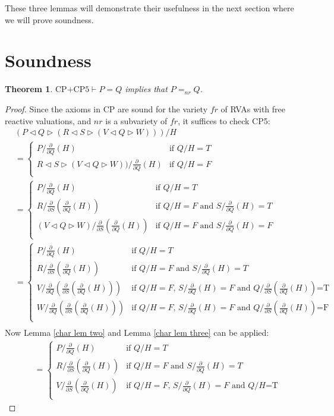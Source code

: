 \documentclass[a4paper,twoside,openright]{report}
\newcommand{\dd}[1]{\frac{\partial}{\partial #1}}
\newcommand{\lef}{\ensuremath{\triangleleft}}
\newcommand{\rig}{\ensuremath{\triangleright}}
\newtheorem{thm}[theorem]{Theorem}
\begin{document}
These three lemmas will demonstrate their usefulness in the next section where we will prove soundness.

\section{Soundness}
\begin{thm}
$\text{CP+CP5}\vdash P=Q$ implies that $P=_{nr}Q$.
\end{thm}
\begin{proof}
Since the axioms in CP are sound for the variety $fr$ of RVAs with free reactive valuations, and $nr$ is a subvariety of $fr$, it suffices to check CP5:
\begin{align*}
&(P\lef Q\rig(R\lef S\rig(V\lef Q\rig W)))/H\\
&=\begin{cases}
P/\dd Q(H) & \text{if $Q/H=T$}\\
R\lef S\rig(V\lef Q\rig W))/\dd Q(H) & \text{if $Q/H=F$}\\
\end{cases}\\
&=\begin{cases}
P/\dd Q(H) & \text{if $Q/H=T$}\\
R/\dd S(\dd Q(H)) & \text{if $Q/H=F$ and $S/\dd Q(H)=T$}\\
(V\lef Q\rig W)/\dd S(\dd Q(H)) & \text{if $Q/H=F$ and $S/\dd Q(H)=F$}\\
\end{cases}\\
&=\begin{cases}
P/\dd Q(H) & \text{if $Q/H=T$}\\
R/\dd S(\dd Q(H)) & \text{if $Q/H=F$ and $S/\dd Q(H)=T$}\\
V/\dd Q(\dd S(\dd Q(H))) & \text{if $Q/H=F$, $S/\dd Q(H)=F$ and $Q/\dd S(\dd Q(H))$=T}\\
W/\dd Q(\dd S(\dd Q(H))) & \text{if $Q/H=F$, $S/\dd Q(H)=F$ and $Q/\dd S(\dd Q(H))$=F}\\
\end{cases}\\
\end{align*}
Now Lemma \ref{char lem two} and Lemma \ref{char lem three} can be
applied:
\begin{align*}
&=\begin{cases}
P/\dd Q(H) & \text{if $Q/H=T$}\\
R/\dd S(\dd Q(H)) & \text{if $Q/H=F$ and $S/\dd Q(H)=T$}\\
V/\dd S(\dd Q(H)) & \text{if $Q/H=F$, $S/\dd Q(H)=F$ and $Q/H$=T}\\

\end{cases}
\end{align*}
\end{proof}
\end{document}
